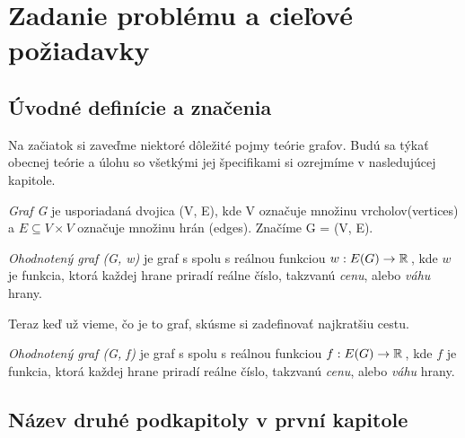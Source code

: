\chapter{Zadanie problému a cieľové požiadavky}

\section{Úvodné definície a značenia}
Na začiatok si zaveďme niektoré dôležité pojmy teórie grafov.
Budú sa týkať obecnej teórie a úlohu so všetkými jej špecifikami si ozrejmíme v nasledujúcej kapitole.
\begin{define}
{\sl Graf G} je usporiadaná dvojica (V, E), kde V označuje množinu vrcholov(vertices) a $E \subseteq V \times V $ označuje množinu hrán (edges). Značíme G = (V, E).
\end{define}

\begin{define}
{\sl Ohodnotený graf (G, w)} je graf s spolu s reálnou funkciou
$w: E(G) \to \mathbb{R}\,$, kde $w$ je funkcia, ktorá každej hrane priradí
reálne číslo, takzvanú \emph{cenu}, alebo \emph{váhu} hrany.
\end{define}


Teraz keď už vieme, čo je to graf, skúsme si zadefinovať najkratšiu cestu.

\begin{define}
{\sl Ohodnotený graf (G, f)} je graf s spolu s reálnou funkciou
$f: E(G) \to \mathbb{R}\,$, kde $f$ je funkcia, ktorá každej hrane priradí
reálne číslo, takzvanú \emph{cenu}, alebo \emph{váhu} hrany.
\end{define}



\section{Název druhé podkapitoly v první kapitole}

